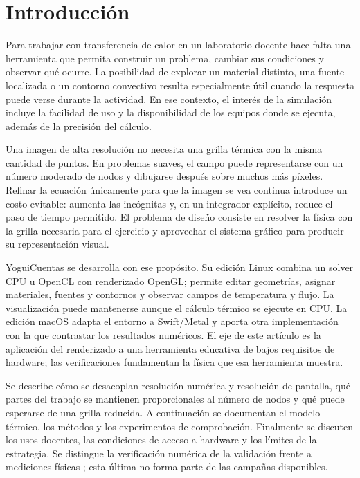 \documentclass[11pt,a4paper]{article}
\begin{document}
\section{Introducción}
Para trabajar con transferencia de calor en un laboratorio docente hace falta una herramienta que permita construir un problema, cambiar sus condiciones y observar qué ocurre. La posibilidad de explorar un material distinto, una fuente localizada o un contorno convectivo resulta especialmente útil cuando la respuesta puede verse durante la actividad. En ese contexto, el interés de la simulación incluye la facilidad de uso y la disponibilidad de los equipos donde se ejecuta, además de la precisión del cálculo.

Una imagen de alta resolución no necesita una grilla térmica con la misma cantidad de puntos. En problemas suaves, el campo puede representarse con un número moderado de nodos y dibujarse después sobre muchos más píxeles. Refinar la ecuación únicamente para que la imagen se vea continua introduce un costo evitable: aumenta las incógnitas y, en un integrador explícito, reduce el paso de tiempo permitido. El problema de diseño consiste en resolver la física con la grilla necesaria para el ejercicio y aprovechar el sistema gráfico para producir su representación visual.

YoguiCuentas \cite{yogui} se desarrolla con ese propósito. Su edición Linux combina un solver CPU u OpenCL con renderizado OpenGL; permite editar geometrías, asignar materiales, fuentes y contornos y observar campos de temperatura y flujo. La visualización puede mantenerse aunque el cálculo térmico se ejecute en CPU. La edición macOS adapta el entorno a Swift/Metal y aporta otra implementación con la que contrastar los resultados numéricos. El eje de este artículo es la aplicación del renderizado a una herramienta educativa de bajos requisitos de hardware; las verificaciones fundamentan la física que esa herramienta muestra.

Se describe cómo se desacoplan resolución numérica y resolución de pantalla, qué partes del trabajo se mantienen proporcionales al número de nodos y qué puede esperarse de una grilla reducida. A continuación se documentan el modelo térmico, los métodos y los experimentos de comprobación. Finalmente se discuten los usos docentes, las condiciones de acceso a hardware y los límites de la estrategia. Se distingue la verificación numérica de la validación frente a mediciones físicas \cite{nasa-verify,nasa-grid}; esta última no forma parte de las campañas disponibles.
\end{document}
